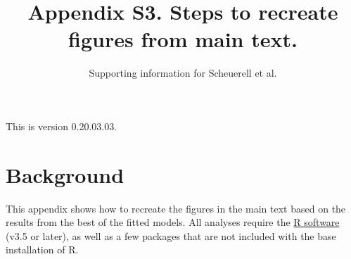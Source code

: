 \documentclass[11pt,]{article}
\title{Appendix S3. Steps to recreate figures from main text.}
\subtitle{Supporting information for Scheuerell et al.}
\author{}
\date{}
\begin{document}
\maketitle

{
\setcounter{tocdepth}{2}
\tableofcontents
}
\vspace{0.2in}

This is version 0.20.03.03.

\section{Background}\label{background}

This appendix shows how to recreate the figures in the main text based
on the results from the best of the fitted models. All analyses require
the \href{https://cran.r-project.org/}{R software} (v3.5 or later), as
well as a few packages that are not included with the base installation
of R.
\end{document}

